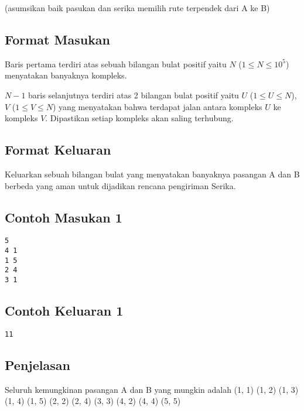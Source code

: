 \documentclass{article}
\begin{document}
(asumsikan baik pasukan dan serika memilih rute terpendek dari A ke B)

\subsection*{Format Masukan}

Baris pertama terdiri atas sebuah bilangan bulat positif yaitu $N$ ($1 \leq N \leq 10^5$) menyatakan banyaknya kompleks.

$N - 1$ baris selanjutnya terdiri atas 2 bilangan bulat positif yaitu $U$ ($1 \leq U \leq N$), $V$ ($1 \leq V \leq N$) yang menyatakan bahwa terdapat jalan antara kompleks $U$ ke kompleks $V$.
Dipastikan setiap kompleks akan saling terhubung.

\subsection*{Format Keluaran}

Keluarkan sebuah bilangan bulat yang menyatakan banyaknya pasangan A dan B berbeda yang aman untuk dijadikan rencana pengiriman Serika.

\begin{multicols}{2}
\subsection*{Contoh Masukan 1}
\begin{lstlisting}
5
4 1
1 5
2 4
3 1
\end{lstlisting}
\columnbreak
\subsection*{Contoh Keluaran 1}
\begin{lstlisting}
11
\end{lstlisting}
\vfill
\null
\end{multicols}


\subsection*{Penjelasan}

Seluruh kemungkinan pasangan A dan B yang mungkin adalah
(1, 1)
(1, 2)
(1, 3)
(1, 4)
(1, 5)
(2, 2)
(2, 4)
(3, 3)
(4, 2)
(4, 4)
(5, 5)
\end{document}
